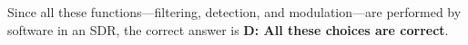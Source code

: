 Since all these functions—filtering, detection, and modulation—are performed by software in an SDR, the correct answer is \textbf{D: All these choices are correct}.

